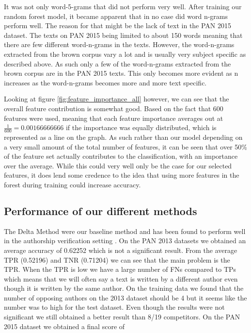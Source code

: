 It was not only word-5-grams that did not perform very well. After training
our random forest model, it became apparent that in no case did word
n-grams perform well. The reason for that might be the lack of text in the PAN
2015 dataset. The texts on PAN 2015 being limited to about 150 words meaning
that there are few different word-n-grams in the texts. However, the
word-n-grams extracted from the brown corpus vary a lot and is usually very
subject specific as described above. As such only a few of the word-n-grams
extracted from the brown corpus are in the PAN 2015 texts. This only becomes
more evident as n increases as the word-n-grams becomes more and more text
specific.

Looking at figure \ref{fig:feature_importance_all} however, we can see that
the overall feature contribution is somewhat good. Based on the fact that
600 features were used, meaning that each feature importance averages out at
$\frac{1}{600} = 0.00166666666$ if the importance was equally distributed, which
is represented as a line on the graph. As such rather than our model depending
on a very small amount of the total number of features, it can be seen that
over 50\% of the feature set actually contributes to the classification, with
an importance over the average. While this could very well only be the case for
our selected features, it does lend some credence to the idea that using more
features in the forest during training could increase accuracy.

\subsection{Performance of our different methods}

The Delta Method were our baseline method and has been found to perform well in
the authorship verification setting \cite{evert2015towards}. On the PAN 2013
datasets we obtained an average accuracy of 0.62252 which is not a significant
result. From the average \gls{TPR} (0.52196) and \gls{TNR} (0.71204) we can see
that the main problem is the \gls{TPR}. When the \gls{TPR} is low we have a
large number of \gls{FN}s compared to \gls{TP}s which means that we will often
say a text is written by a different author even though it is written by the
same author. On the training data we found that the number of opposing authors
on the 2013 dataset should be 4 but it seems like the number was to high for the
test dataset. Even though the results were not significant we still obtained a
better result than 8/19 competitors. On the PAN 2015 dataset we obtained a final
score of %

